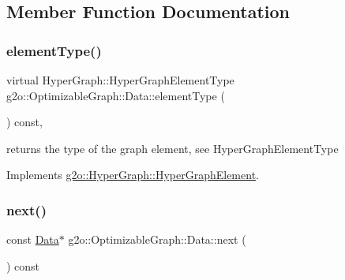 \subsection{Member Function Documentation}
\mbox{\label{classg2o_1_1_optimizable_graph_1_1_data_aa98d48f62d4c620cb62fbaeb1775389b}} 
\subsubsection{\texorpdfstring{element\+Type()}{elementType()}}
{\footnotesize\ttfamily virtual Hyper\+Graph\+::\+Hyper\+Graph\+Element\+Type g2o\+::\+Optimizable\+Graph\+::\+Data\+::element\+Type (\begin{DoxyParamCaption}{ }\end{DoxyParamCaption}) const\hspace{0.3cm}{\ttfamily [inline]}, {\ttfamily [virtual]}}

returns the type of the graph element, see Hyper\+Graph\+Element\+Type 

Implements \mbox{\hyperlink{structg2o_1_1_hyper_graph_1_1_hyper_graph_element_a1a9d7b748698c09d202373e06e413ef2}{g2o\+::\+Hyper\+Graph\+::\+Hyper\+Graph\+Element}}.

\mbox{\label{classg2o_1_1_optimizable_graph_1_1_data_a1e36ab8bfbbd4df1639338330bbaaf3c}} 
\subsubsection{\texorpdfstring{next()}{next()}\hspace{0.1cm}{\footnotesize\ttfamily [1/2]}}
{\footnotesize\ttfamily const \mbox{\hyperlink{classg2o_1_1_optimizable_graph_1_1_data}{Data}}$\ast$ g2o\+::\+Optimizable\+Graph\+::\+Data\+::next (\begin{DoxyParamCaption}{ }\end{DoxyParamCaption}) const\hspace{0.3cm}{\ttfamily [inline]}}

